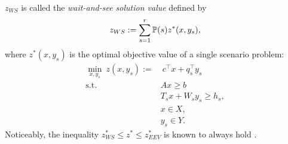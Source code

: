 $z_{WS}$ is called the \textit{wait-and-see solution value} defined by
\begin{align} \label{ws}
	z_{WS}:=\sum_{s=1}^r \operatorname*{\mathbb{P}}(s)z^*(x,y_s),
\end{align}
where $z^*(x,y_s)$ is the optimal objective value of a single scenario problem: 
\begin{subequations}
	\begin{align}
	\min_{x,y_s}\ z(x,y_s):=&\ c^\top x+q_s^\top y_s \label{ssp:obj}\\
	\mathrm{s.t.}\ &Ax \ge b \label{ssp:b}\\
	&T_s x + W_s y_s\ge h_s,  \label{ssp:c}\\
	&x\in X,  \label{ssp:d}\\
	&y_s \in Y. \label{ssp:e}
	\end{align}
\end{subequations}
Noticeably, the inequality $z^*_{WS}\le z^*\le z^*_{EEV}$ is known to always hold \cite{journal:SKS2013}.

